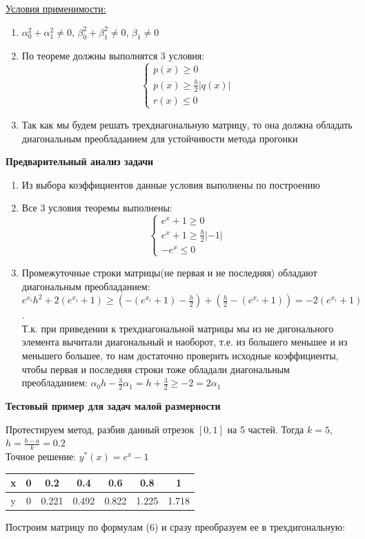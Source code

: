 \documentclass{article}
\begin{document}
	\underline{Условия применимости:}
	\begin{enumerate}
		\item $\alpha_0^2+\alpha_1^2 \neq 0$, $\beta_0^2+\beta_1^2 \neq 0$, $\beta_1 \neq 0$
		\item По теореме должны выполнятся 3 условия:
		$$
		\begin{cases}
			p(x) \geq 0\\
			p(x) \geq \frac{h}{2}|q(x)|\\
			r(x) \leq 0
		\end{cases}
		$$
		\item Так как мы будем решать трехдиагональную матрицу, то она должна обладать диагональным преобладанием для устойчивости метода прогонки 
	\end{enumerate} 
	\begin{center} \textbf{Предварительный анализ задачи}\end{center}
	\begin{enumerate}
		\item Из выбора коэффициентов данные условия выполнены по построению
		\item Все 3 условия теоремы выполнены:
		$$
		\begin{cases}
			e^x + 1 \geq 0\\
			e^x  + 1 \geq \frac{h}{2}|-1|\\
			-e^x \leq 0
		\end{cases}
		$$
		\item Промежуточные строки матрицы(не первая и не последняя) обладают диагональным преобладанием: $\displaystyle e^{x_i}h^2 + 2(e^{x_i} + 1) \geq (-(e^{x_i} + 1) - \frac{h}{2}) + (\frac{h}{2} - (e^{x_i} + 1)) = -2(e^{x_i} + 1)$.\\ 
		Т.к. при приведении к трехдиагональной матрицы мы из не дигонального элемента вычитали диагональный и наоборот, т.е. из большего меньшее и из меньшего большее, то нам достаточно проверить исходные коэффициенты, чтобы первая и последняя строки тоже обладали диагональным преобладанием:
		$\displaystyle \alpha_0h - \frac{3}{2}\alpha_1 = h + \frac{3}{2} \geq -2 = 2\alpha_1$
	\end{enumerate}
	\begin{center} \textbf{Тестовый пример для задач малой размерности}\end{center}
	Протестируем метод, разбив данный отрезок $[0,1]$ на 5 частей. Тогда $k=5$, $\displaystyle h = \frac{b-a}{k} = 0.2$\\
	Точное решение: $y^*(x) = e^x - 1$
	\begin{center}
		\begin{tabular}{|c|c|c|c|c|c|c|}
			\hline
			x & 0 & 0.2 & 0.4 & 0.6 & 0.8 & 1\\
			\hline
			y & 0 & 0.221 & 0.492 & 0.822 & 1.225 & 1.718\\
			\hline
		\end{tabular}
	\end{center}
	Построим матрицу по формулам (6) и сразу преобразуем ее в трехдигональную:
\end{document}
